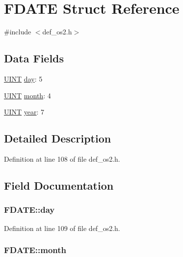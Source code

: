 \hypertarget{structFDATE}{\section{F\+D\+A\+T\+E Struct Reference}
\label{structFDATE}
}


{\ttfamily \#include $<$def\+\_\+os2.\+h$>$}

\subsection*{Data Fields}
\begin{DoxyCompactItemize}
\item 
\hyperlink{def__os2_8h_a36cb3b01d81ffd844bbbfb54003e06ec}{U\+I\+N\+T} \hyperlink{structFDATE_a2c827145bf7db2bc0aa35eaa6ae213ef}{day}\+: 5
\item 
\hyperlink{def__os2_8h_a36cb3b01d81ffd844bbbfb54003e06ec}{U\+I\+N\+T} \hyperlink{structFDATE_a14b8f8ca1fdb30a3f95dc315fa960a06}{month}\+: 4
\item 
\hyperlink{def__os2_8h_a36cb3b01d81ffd844bbbfb54003e06ec}{U\+I\+N\+T} \hyperlink{structFDATE_a832478adab77f17cb5c12bd5c8b5370b}{year}\+: 7
\end{DoxyCompactItemize}


\subsection{Detailed Description}


Definition at line 108 of file def\+\_\+os2.\+h.



\subsection{Field Documentation}
\hypertarget{structFDATE_a2c827145bf7db2bc0aa35eaa6ae213ef}{
\subsubsection[{day}]{ F\+D\+A\+T\+E\+::day}}\label{structFDATE_a2c827145bf7db2bc0aa35eaa6ae213ef}


Definition at line 109 of file def\+\_\+os2.\+h.

\hypertarget{structFDATE_a14b8f8ca1fdb30a3f95dc315fa960a06}{
\subsubsection[{month}]{ F\+D\+A\+T\+E\+::month}}\label{structFDATE_a14b8f8ca1fdb30a3f95dc315fa960a06}


